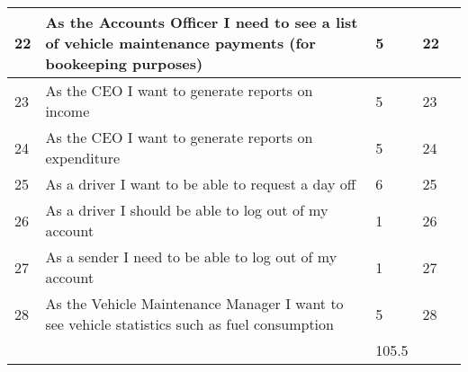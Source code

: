 \documentclass[paper=a4, fontsize=11pt]{scrartcl} %
\numberwithin{equation}{section} %
\numberwithin{figure}{section} %
\numberwithin{table}{section} %
\begin{document}
\begin{table}[]
\begin{tabular}{|p{1cm}|p{8cm}|p{2cm}|p{1.2cm}|p{1.5cm}|}
22          & As the Accounts Officer I need to see a list of vehicle maintenance payments (for bookeeping purposes) & 5                 & 22                &                \\ \hline
23          & As the CEO I want to generate reports on income                                                        & 5                 & 23                &                \\ \hline
24          & As the CEO I want to generate reports on expenditure                                                   & 5                 & 24                &                \\ \hline
25          & As a driver I want to be able to request a day off                                                     & 6                 & 25                &                \\ \hline
26          & As a driver I should be able to log out of my account                                                  & 1                 & 26                &                \\ \hline
27          & As a sender I need to be able to log out of my account                                                 & 1                 & 27                &                \\ \hline
28          & As the Vehicle Maintenance Manager I want to see vehicle statistics such as fuel consumption           & 5                 & 28                &                \\ \hline
            &                                                                                                        & 105.5             &                   &                \\ \hline
\end{tabular}
\end{table}


\end{document}
